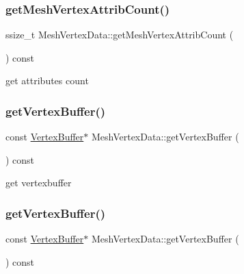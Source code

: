 \subsubsection{\texorpdfstring{get\+Mesh\+Vertex\+Attrib\+Count()}{getMeshVertexAttribCount()}\hspace{0.1cm}{\footnotesize\ttfamily [2/2]}}
{\footnotesize\ttfamily ssize\+\_\+t Mesh\+Vertex\+Data\+::get\+Mesh\+Vertex\+Attrib\+Count (\begin{DoxyParamCaption}{ }\end{DoxyParamCaption}) const\hspace{0.3cm}{\ttfamily [inline]}}

get attributes count \mbox{\label{classMeshVertexData_aaf55681103d18dbf53f36a95d0c14531}} 
\subsubsection{\texorpdfstring{get\+Vertex\+Buffer()}{getVertexBuffer()}\hspace{0.1cm}{\footnotesize\ttfamily [1/2]}}
{\footnotesize\ttfamily const \hyperlink{classVertexBuffer}{Vertex\+Buffer}$\ast$ Mesh\+Vertex\+Data\+::get\+Vertex\+Buffer (\begin{DoxyParamCaption}{ }\end{DoxyParamCaption}) const\hspace{0.3cm}{\ttfamily [inline]}}

get vertexbuffer \mbox{\label{classMeshVertexData_aaf55681103d18dbf53f36a95d0c14531}} 
\subsubsection{\texorpdfstring{get\+Vertex\+Buffer()}{getVertexBuffer()}\hspace{0.1cm}{\footnotesize\ttfamily [2/2]}}
{\footnotesize\ttfamily const \hyperlink{classVertexBuffer}{Vertex\+Buffer}$\ast$ Mesh\+Vertex\+Data\+::get\+Vertex\+Buffer (\begin{DoxyParamCaption}{ }\end{DoxyParamCaption}) const\hspace{0.3cm}{\ttfamily [inline]}}

